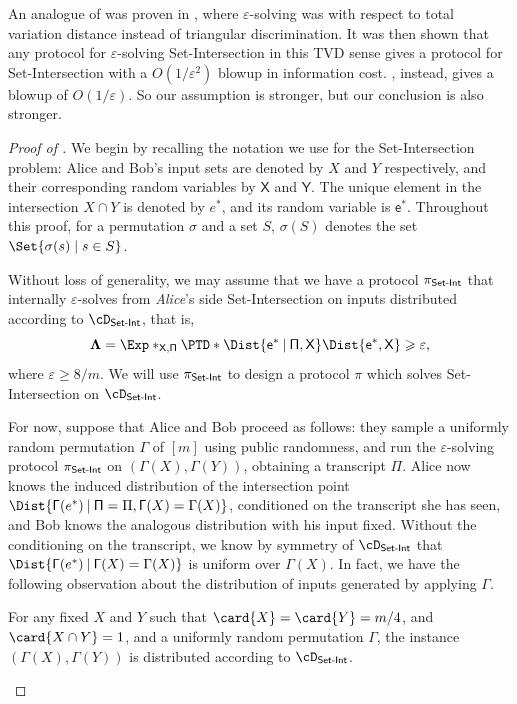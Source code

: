 \documentclass[11pt,letterpaper]{article}
\newcommand{\eps}{\varepsilon}
\renewcommand{\geq}{\geqslant}
\theoremstyle{definition}
\providecommand{\given}
\DeclarePairedDelimiter{\card}\vert\vert
\renewcommand\given{\nonscript\: \delimsize\vert{} \nonscript\: \mathopen{}}
\renewcommand{\given}{\nonscript\: \vert \nonscript\:}
\newcommand{\dsi}{\cD_\SI}
\newcommand{\pisi}{\pi_\SI}
\newcommand{\re}{\rv{e}}
\newcommand{\estar}{e^{\ast}}
\newcommand{\restar}{\re^{\ast}}
\newcommand{\rPi}{\rv{\Pi}}
\newcommand{\Perm}{\Gamma}
\newcommand{\rPerm}{\rv{\Gamma}}
\newcommand{\rPTD}{\mathbf{\Lambda}}
\newcommand{\rX}{\rv{X}}
\newcommand{\rY}{\rv{Y}}
\newcommand{\rv}[1]{\ensuremath{\mathsf{#1}}}
\newcommand{\SI}{\ensuremath{\textnormal{\textsf{Set-Int}}}\xspace}
\begin{document}
An analogue of  was proven in
\cite{AssadiR20}, where $\eps$-solving was with respect to total variation
distance instead of triangular discrimination.
It was then shown that any protocol for $\eps$-solving Set-Intersection in this
TVD sense gives a protocol for Set-Intersection with a $O(1/\eps^2)$
blowup in information cost.
, instead, gives a blowup of $O(1/\eps)$.
So our assumption is stronger, but our conclusion is also stronger.

\begin{proof}[Proof of ]
We begin by recalling the notation we use for the Set-Intersection problem:
Alice and Bob's input sets are
denoted by $X$ and $Y$ respectively, and their corresponding random variables
by $\rX$ and $\rY$.
The unique element in the intersection $X \cap Y$ is denoted by $\estar$,
and its random variable is $\restar$.
Throughout this proof, for a permutation $\sigma$ and a set $S$,
$\sigma(S)$ denotes the set $\Set{ \sigma(s) \mid s \in S }$.

\noindent
Without loss of generality, we may assume that we have a protocol $\pisi$ that
internally $\eps$-solves from \emph{Alice}'s side
Set-Intersection on inputs distributed according to $\dsi$, that is,
\[
  \rPTD = 
  \Exp*_{\rX, \rPi}{
     \PTD*{ \Dist{ \restar \given \rPi, \rX}}
     {\Dist{ \restar, \rX}}
  } \geq \eps,
\]
where $\eps \geq 8 / m$.
We will use $\pisi$ to design a protocol $\pi$ which solves Set-Intersection
on $\dsi$.

For now, suppose that Alice and Bob proceed as follows: they sample a uniformly
random permutation $\Perm$ of $[m]$ using public randomness, and run the
$\eps$-solving protocol $\pisi$ on $(\Perm(X), \Perm(Y))$, obtaining a
transcript $\Pi$.
Alice now knows the induced distribution of the intersection
point $\Dist{\rPerm(\estar) \given \rPi = \Pi, \rPerm(X) = \Perm(X)}$, conditioned
on the transcript she has seen, and Bob knows the analogous distribution with
his input fixed.
Without the conditioning on the transcript, we know by symmetry of $\dsi$ that
$\Dist{\rPerm(\estar) \given \rPerm(X) = \Perm(X)}$ is uniform over $\Perm(X)$.
In fact, we have the following observation about the distribution of inputs
generated by applying $\rPerm$.

\begin{observation}\label{obsv:dsi}
  For any fixed $X$ and $Y$ such that $\card{X} = \card{Y} = m / 4$, and
  $\card{X \cap Y} = 1$,
  and a uniformly random permutation $\rPerm$,
  the instance $(\rPerm(X), \rPerm(Y))$ is distributed according to $\dsi$.
\end{observation}


\end{proof}
\end{document}
